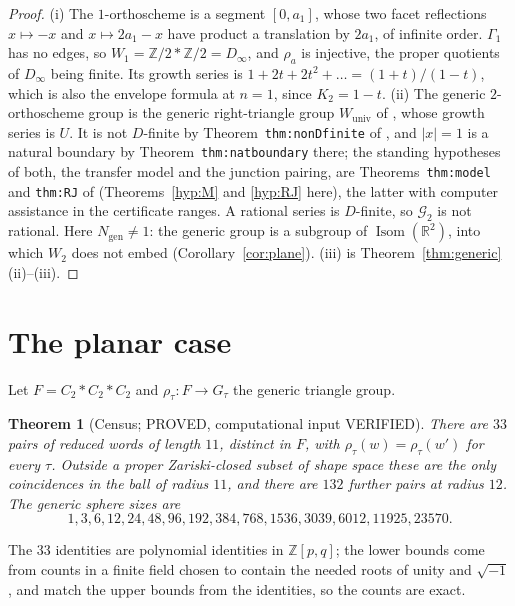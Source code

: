 \documentclass[11pt]{article}
\newtheorem{theorem}{Theorem}[section]
\theoremstyle{definition}
\theoremstyle{remark}
\theoremstyle{definition}
\newcommand{\Z}{\mathbb{Z}}
\newcommand{\R}{\mathbb{R}}
\newcommand{\Isom}{\operatorname{Isom}}
\begin{document}
\begin{proof}
(i) The $1$-orthoscheme is a segment $[0,a_1]$, whose two facet reflections $x\mapsto-x$ and
$x\mapsto2a_1-x$ have product a translation by $2a_1$, of infinite order. $\Gamma_1$ has no edges,
so $W_1=\Z/2\ast\Z/2=D_\infty$, and $\rho_a$ is injective, the proper quotients of $D_\infty$ being
finite. Its growth series is $1+2t+2t^2+\dots=(1+t)/(1-t)$, which is also the envelope formula at
$n=1$, since $K_2=1-t$. (ii) The generic $2$-orthoscheme group is the generic right-triangle group
$W_{\mathrm{univ}}$ of \cite{paper2}, whose growth series is $U$. It is not $D$-finite by
Theorem~\texttt{thm:nonDfinite} of \cite{paper2}, and $|x|=1$ is a natural boundary by
Theorem~\texttt{thm:natboundary} there; the standing hypotheses of both, the transfer model and the
junction pairing, are Theorems~\texttt{thm:model} and \texttt{thm:RJ} of \cite{paper2}
(Theorems~\ref{hyp:M} and \ref{hyp:RJ} here), the latter with computer assistance in the
certificate ranges. A rational series is $D$-finite, so $\mathcal G_2$ is not rational. Here
$N_{\mathrm{gen}}\ne1$: the generic group is a subgroup of $\Isom(\R^2)$, into which $W_2$ does not
embed (Corollary~\ref{cor:plane}). (iii) is
Theorem~\ref{thm:generic}(ii)--(iii).
\end{proof}

\section{The planar case}\label{sec:plane}

Let $F=C_2\ast C_2\ast C_2$ and $\rho_\tau\colon F\to G_\tau$ the generic triangle group.

\begin{theorem}[Census; PROVED, computational input VERIFIED]\label{thm:census}
There are $33$ pairs of reduced words of length $11$, distinct in $F$, with
$\rho_\tau(w)=\rho_\tau(w')$ for every $\tau$. Outside a proper Zariski-closed subset of shape
space these are the only coincidences in the ball of radius $11$, and there are $132$ further
pairs at radius $12$. The generic sphere sizes are
\[
 1,3,6,12,24,48,96,192,384,768,1536,3039,6012,11925,23570 .
\]
\end{theorem}

The $33$ identities are polynomial identities in $\Z[p,q]$; the lower bounds come from counts in
a finite field chosen to contain the needed roots of unity and $\sqrt{-1}$, and match the upper
bounds from the identities, so the counts are exact.
\end{document}
